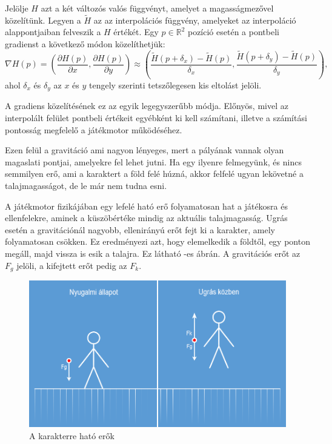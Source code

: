 Jelölje $H$ azt a két változós valós függvényt, amelyet a magasságmezővel közelítünk. Legyen a $\widetilde{H}$ az az interpolációs függvény, amelyeket az interpoláció alappontjaiban felveszik a $H$ értékét. Egy $p \in \mathbb{R}^2$ pozíció esetén a pontbeli gradienst a következő módon közelíthetjük:
$$
\nabla H(p) =
\left( \dfrac{\partial H(p)}{\partial x}, \dfrac{\partial H(p)}{\partial y} \right)
\approx
\left(
\dfrac{\widetilde{H}(p + \delta_x) - \widetilde{H}(p)}{\delta_x},
\dfrac{\widetilde{H}(p + \delta_y) - \widetilde{H}(p)}{\delta_y}
\right),
$$
ahol $\delta_x$ és $\delta_y$ az $x$ és $y$ tengely szerinti tetszőlegesen kis eltolást jelöli.

A gradiens közelítésének ez az egyik legegyszerűbb módja. Előnyös, mivel az interpolált felület pontbeli értékeit egyébként ki kell számítani, illetve a számítási pontosság megfelelő a játékmotor működéséhez.

Ezen felül a gravitáció ami nagyon lényeges, mert a pályának vannak olyan magaslati pontjai, amelyekre fel lehet jutni. Ha egy ilyenre felmegyünk, és nincs semmilyen erő, ami a karaktert a föld felé húzná, akkor felfelé ugyan lekövetné a talajmagasságot, de le már nem tudna esni.

A játékmotor fizikájában egy lefelé ható erő folyamatosan hat a játékosra és ellenfelekre, aminek a küszöbértéke mindig az aktuális talajmagasság. Ugrás esetén a gravitációnál nagyobb, ellenirányú erőt fejt ki a karakter, amely folyamatosan csökken. Ez eredményezi azt, hogy elemelkedik a földtől, egy ponton megáll, majd vissza is esik a talajra. Ez látható -es ábrán. A gravitációs erőt az $F_g$ jelöli, a kifejtett erőt pedig az $F_k$.

\begin{figure}[h]
\centering
\includegraphics[scale=0.6]{kepek/gravity.png}
\caption{A karakterre ható erők}
\label{fig:gravity}
\end{figure}

